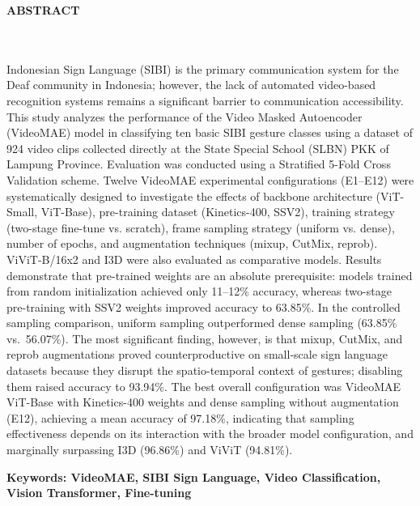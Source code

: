 \clearpage
{}%
\thispagestyle{fancy}

\begin{center}
	\large \bfseries \MakeUppercase{Abstract}\\
	\normalsize \normalfont {\thetitleEN}\\
	\normalsize \normalfont {\theauthor}\\
	\bigskip

	\normalsize \normalfont \justifying \singlespacing
	Indonesian Sign Language (SIBI) is the primary communication system for the Deaf community in Indonesia; however, the lack of automated video-based recognition systems remains a significant barrier to communication accessibility. This study analyzes the performance of the Video Masked Autoencoder (VideoMAE) model in classifying ten basic SIBI gesture classes using a dataset of 924 video clips collected directly at the State Special School (SLBN) PKK of Lampung Province. Evaluation was conducted using a Stratified 5-Fold Cross Validation scheme. Twelve VideoMAE experimental configurations (E1--E12) were systematically designed to investigate the effects of backbone architecture (ViT-Small, ViT-Base), pre-training dataset (Kinetics-400, SSV2), training strategy (two-stage fine-tune vs. scratch), frame sampling strategy (uniform vs. dense), number of epochs, and augmentation techniques (mixup, CutMix, reprob). ViViT-B/16x2 and I3D were also evaluated as comparative models. Results demonstrate that pre-trained weights are an absolute prerequisite: models trained from random initialization achieved only 11--12\% accuracy, whereas two-stage pre-training with SSV2 weights improved accuracy to 63.85\%. In the controlled sampling comparison, uniform sampling outperformed dense sampling (63.85\% vs.\ 56.07\%). The most significant finding, however, is that mixup, CutMix, and reprob augmentations proved counterproductive on small-scale sign language datasets because they disrupt the spatio-temporal context of gestures; disabling them raised accuracy to 93.94\%. The best overall configuration was VideoMAE ViT-Base with Kinetics-400 weights and dense sampling without augmentation (E12), achieving a mean accuracy of 97.18\%, indicating that sampling effectiveness depends on its interaction with the broader model configuration, and marginally surpassing I3D (96.86\%) and ViViT (94.81\%).\par

    \vspace{20pt}
	\raggedright\textbf{Keywords: VideoMAE, SIBI Sign Language, Video Classification, Vision Transformer, Fine-tuning}

	\vfill

\end{center}
\clearpage
